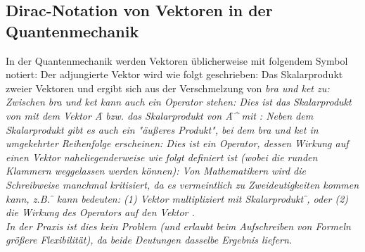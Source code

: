 \subsection{Dirac-Notation von Vektoren in der Quantenmechanik}
In der Quantenmechanik werden Vektoren üblicherweise mit folgendem Symbol notiert:
Der adjungierte Vektor wird wie folgt geschrieben: 
Das Skalarprodukt zweier Vektoren  und  ergibt sich aus der Verschmelzung von \it{bra} und \it{ket} zu: 
Zwischen \it{bra} und \it{ket} kann auch ein Operator stehen:
Dies ist das Skalarprodukt von  mit dem Vektor \f{A} bzw. das Skalarprodukt von \f{A^\dagger{}} mit : 
Neben dem Skalarprodukt gibt es auch ein "äußeres Produkt", bei dem \it{bra} und \it{ket} in umgekehrter Reihenfolge erscheinen:
Dies ist ein Operator, dessen Wirkung auf einen Vektor  naheliegenderweise wie folgt definiert ist (wobei die runden Klammern weggelassen werden können):
Von Mathematikern wird die Schreibweise manchmal kritisiert, da es vermeintlich zu Zweideutigkeiten kommen kann, z.B. \f{} kann bedeuten: (1) Vektor  multipliziert mit Skalarprodukt \f{}, oder (2) die Wirkung des Operators  auf den Vektor .\\
In der Praxis ist dies kein Problem (und erlaubt beim Aufschreiben von Formeln größere Flexibilität), da beide Deutungen dasselbe Ergebnis liefern.

